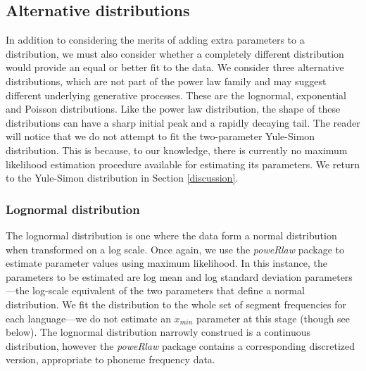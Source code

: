 \hypertarget{alternative-distributions}{%
\subsection{Alternative distributions}\label{alternative-distributions}}

In addition to considering the merits of adding extra parameters to a distribution, we must also consider whether a completely different distribution would provide an equal or better fit to the data. We consider three alternative distributions, which are not part of the power law family and may suggest different underlying generative processes. These are the lognormal, exponential and Poisson distributions. Like the power law distribution, the shape of these distributions can have a sharp initial peak and a rapidly decaying tail. The reader will notice that we do not attempt to fit the two-parameter Yule-Simon distribution. This is because, to our knowledge, there is currently no maximum likelihood estimation procedure available for estimating its parameters. We return to the Yule-Simon distribution in Section \ref{discussion}.

\hypertarget{lognormal-distribution}{%
\subsubsection{Lognormal distribution}\label{lognormal-distribution}}

The lognormal distribution is one where the data form a normal distribution when transformed on a log scale. Once again, we use the \emph{poweRlaw} package \autocite{gillespie_fitting_2014} to estimate parameter values using maximum likelihood. In this instance, the parameters to be estimated are log mean and log standard deviation parameters---the log-scale equivalent of the two parameters that define a normal distribution. We fit the distribution to the whole set of segment frequencies for each language---we do not estimate an \(x_{min}\) parameter at this stage (though see below). The lognormal distribution narrowly construed is a continuous distribution, however the \emph{poweRlaw} package contains a corresponding discretized version, appropriate to phoneme frequency data.

